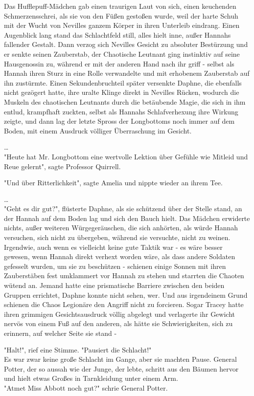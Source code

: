 {Das Hufflepuff-Mädchen gab einen traurigen Laut von sich, einen keuchenden Schmerzensschrei, als sie von den Füßen gestoßen wurde, weil der harte Schuh mit der Wucht von Nevilles ganzem Körper in ihren Unterleib eindrang. Einen Augenblick lang stand das Schlachtfeld still, alles hielt inne, außer Hannahs fallender Gestalt. Dann verzog sich Nevilles Gesicht zu absoluter Bestürzung und er senkte seinen Zauberstab, der Chaotische Leutnant ging instinktiv auf seine Hausgenossin zu, während er mit der anderen Hand nach ihr griff - selbst als Hannah ihren Sturz in eine Rolle verwandelte und mit erhobenem Zauberstab auf ihn zustürmte. Einen Sekundenbruchteil später versenkte Daphne, die ebenfalls nicht gezögert hatte, ihre uralte Klinge direkt in Nevilles Rücken, wodurch die Muskeln des chaotischen Leutnants durch die betäubende Magie, die sich in ihm entlud, krampfhaft zuckten, selbst als Hannahs Schlafverhexung ihre Wirkung zeigte, und dann lag der letzte Spross der Longbottoms noch immer auf dem Boden, mit einem Ausdruck völliger Überraschung im Gesicht.

…\\ "Heute hat Mr. Longbottom eine wertvolle Lektion über Gefühle wie Mitleid und Reue gelernt", sagte Professor Quirrell.

"Und über Ritterlichkeit", sagte Amelia und nippte wieder an ihrem Tee.

…\\ "Geht es dir gut?", flüsterte Daphne, als sie schützend über der Stelle stand, an der Hannah auf dem Boden lag und sich den Bauch hielt. Das Mädchen erwiderte nichts, außer weiteren Würgegeräuschen, die sich anhörten, als würde Hannah versuchen, sich nicht zu übergeben, während sie versuchte, nicht zu weinen. Irgendwie, auch wenn es vielleicht keine gute Taktik war - es wäre besser gewesen, wenn Hannah direkt verhext worden wäre, als dass andere Soldaten gefesselt wurden, um sie zu beschützen - schienen einige Sonnen mit ihren Zauberstäben fest umklammert vor Hannah zu stehen und starrten die Chaoten wütend an. Jemand hatte eine prismatische Barriere zwischen den beiden Gruppen errichtet, Daphne konnte nicht sehen, wer. Und aus irgendeinem Grund schienen die Chaos Legionäre den Angriff nicht zu forcieren. Sogar Tracey hatte ihren grimmigen Gesichtsausdruck völlig abgelegt und verlagerte ihr Gewicht nervös von einem Fuß auf den anderen, als hätte sie Schwierigkeiten, sich zu erinnern, auf welcher Seite sie stand -

"Halt!", rief eine Stimme. "Pausiert die Schlacht!"\\ Es war zwar keine große Schlacht im Gange, aber sie machten Pause. General Potter, der so aussah wie der Junge, der lebte, schritt aus den Bäumen hervor und hielt etwas Großes in Tarnkleidung unter einem Arm.\\ "Atmet Miss Abbott noch gut?" schrie General Potter.

}
